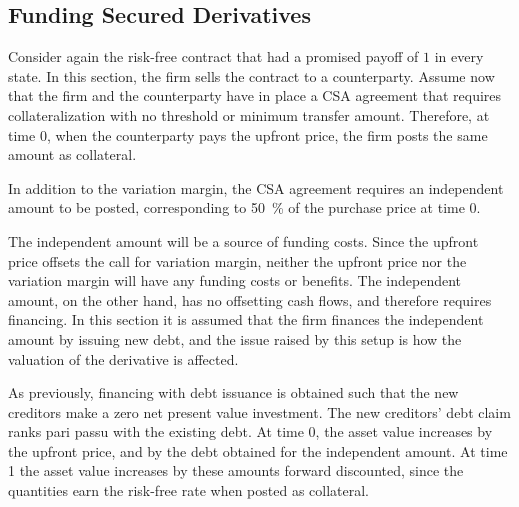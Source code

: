 \documentclass[main.tex]{subfiles}
\begin{document}
    \subsection{Funding Secured Derivatives}
    \label{sec:example-secured-derivative}
        Consider again the risk-free contract that had a promised payoff of $\num{1}$ in every state.
        In this section, the firm sells the contract to a counterparty.
        Assume now that the firm and the counterparty have in place a CSA agreement
        that requires collateralization with no threshold or minimum transfer amount.
        Therefore, at time 0, when the counterparty pays the upfront price,
        the firm posts the same amount as collateral.

        In addition to the variation margin, 
        the CSA agreement requires an independent amount to be posted,
        corresponding to \qty[round-precision=0]{50}{\percent} of the purchase price at time 0.

        The independent amount will be a source of funding costs.
        Since the upfront price offsets the call for variation margin,
        neither the upfront price nor the variation margin will have any funding costs or benefits.
        The independent amount, on the other hand, has no offsetting cash flows, 
        and therefore requires financing.
        In this section it is assumed that the firm finances the independent amount by issuing new debt,
        and the issue raised by this setup is how the valuation of the derivative is affected.

        As previously, financing with debt issuance is obtained 
        such that the new creditors make a zero net present value investment.
        The new creditors' debt claim ranks pari passu with the existing debt.
        At time 0, the asset value increases by the upfront price,
        and by the debt obtained for the independent amount.
        At time 1 the asset value increases by these amounts forward discounted,
        since the quantities earn the risk-free rate when posted as collateral.
\end{document}
